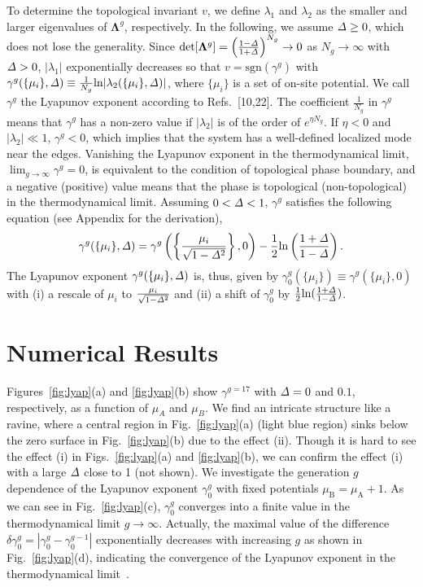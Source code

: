 \documentclass[%
superscriptaddress,
preprint,
amsmath,amssymb,
]{revtex4-1}
\newcommand{\lt}{\left}
\newcommand{\rt}{\right}
\newcommand{\mrm}{\mathrm}
\newcommand{\mbf}{\mathbf}
\begin{document}
To determine the topological invariant $v$, we define $\lambda_1$ and $\lambda_2$ as the smaller and larger eigenvalues of $\mbf{\Lambda}^g$, respectively. 
In the following, we assume ${\it\Delta}\geq0$, which does not lose the generality.
Since $\mrm{det}[\mbf{\Lambda}^g]=\lt(\frac{1-{\it\Delta}}{1+{\it\Delta}}\rt)^{N_g} \to 0$ as $N_g\to\infty$ with ${\it\Delta}>0$, $|\lambda_1|$ exponentially decreases so that $v=\mrm{sgn}(\gamma^{g})$ with $\gamma^{g}(\{\mu_i\},{\it\Delta})\equiv \frac{1}{N_g} \mrm{ln}|\lambda_2(\{\mu_i\},{\it\Delta})|$, where $\{\mu_i\}$ is a set of on-site potential.
We call $\gamma^g$ the Lyapunov exponent according to Refs.~[10,22]. 
The coefficient $\frac{1}{N_g}$ in $\gamma^g$  means that $\gamma^g$ has a non-zero value if $|\lambda_2|$ is of the order of $e^{\eta N_g}$. If $\eta<0$ and $|\lambda_2|\ll 1$, $\gamma^g<0$, which implies that the system has a well-defined localized mode near the edges.
Vanishing the Lyapunov exponent in the thermodynamical limit, $\lim_{g\to\infty} \gamma^g=0$, is equivalent to the condition of topological phase boundary, and a negative (positive) value means that the phase is topological (non-topological) in the thermodynamical limit. 	
Assuming $0<{\it\Delta}<1$, $\gamma^g$ satisfies the following equation (see Appendix for the derivation),
\begin{equation}
\gamma^g(\{\mu_i\},{\it\Delta})=\gamma^g\lt(\lt\{\frac{\mu_i}{\sqrt{1-{\it\Delta}^2}}\rt\},0\rt)-\frac{1}{2}\mrm{ln}\lt(\frac{1+{\it\Delta}}{1-{\it\Delta}}\rt).
\label{eq:lyup}
\end{equation}
The Lyapunov exponent $\gamma^g(\{\mu_i\},{\it\Delta})$ is, thus, given by $\gamma_0^g\lt(\{\mu_i\}\rt)\equiv\gamma^g(\{\mu_i\},0)$ with (i) a rescale of $\mu_i$ to $\frac{\mu_i}{\sqrt{1-{\it\Delta}^2}}$ and (ii) a shift of $\gamma_0^g$ by $\frac{1}{2}\mrm{ln}(\frac{1+{\it\Delta}}{1-{\it\Delta}})$.


\section{\label{Numerical}Numerical Results}
Figures~\ref{fig:lyap}(a) and \ref{fig:lyap}(b) show $\gamma^{g=17}$ with ${\it\Delta}=0$ and $0.1$, respectively, as a function of $\mu_A$ and $\mu_B$. 
We find an intricate structure like a ravine, where a central region in Fig.~\ref{fig:lyap}(a) (light blue region) sinks below the zero surface in Fig.~\ref{fig:lyap}(b) due to the effect (ii).
Though it is hard to see the effect (i) in Figs.~\ref{fig:lyap}(a) and \ref{fig:lyap}(b), we can confirm the effect (i) with a large ${\it\Delta}$ close to 1 (not shown).
We investigate the generation $g$ dependence of the Lyapunov exponent $\gamma_0^{g}$ with fixed potentials $\mu_{\mrm{B}}=\mu_{\mrm{A}}+1$.
As we can see in Fig.~\ref{fig:lyap}(c), $\gamma_0^g$ converges into a finite value in the thermodynamical limit $g\to\infty$.
Actually, the maximal value of the difference $\delta \gamma_0^g=|\gamma_0^g-\gamma_0^{g-1}|$ exponentially decreases with increasing $g$ as shown in Fig.~\ref{fig:lyap}(d), indicating the convergence of the Lyapunov exponent in the thermodynamical limit~\cite{note2}.
\end{document}
